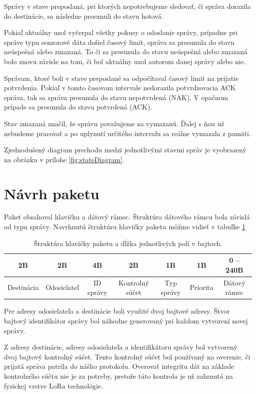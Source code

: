 \documentclass[slovak,master]{diploma}
\begin{document}
Správy v stave preposlaná, pri ktorých nepotrebujeme sledovať, či správa dorazila do destinácie, sa následne presunuli do stavu hotová.

Pokiaľ aktuálny uzol vyčerpal všetky pokusy o odoslanie správy, prípadne pri správe typu senzorové dáta došiel časový limit, správa sa presunula do stavu neúspešná alebo zmazaná.
To či sa presunula do stavu neúspešná alebo zmazaná bolo znovu závisle na tom, či bol aktuálny uzol autorom danej správy alebo nie.

Správam, ktoré boli v stave preposlané sa odpočítaval časový limit na prijatie potvrdenia. Pokiaľ v tomto časovom intervale nedorazila potvrdzovacia ACK správa, tak sa 
správa presunula do stavu nepotvrdená (NAK). V opačnom prípade sa presunula do stavu potvrdená (ACK).

Stav zmazaná značil, že správu považujeme za vymazanú. Ďalej s ňou už nebudeme pracovať a po uplynutí určitého intervalu sa reálne vymazala z pamäti.

Zjednodušený diagram prechodu medzi jednotlivými stavmi správ je vyobrazený na obrázku v prílohe \ref{fig:stateDiagram}.

\section{Návrh paketu}
Paket obsahoval hlavičku a dátový rámec. Štruktúra dátového rámcu bola závislá od typu správy.
Navrhnutú štruktúru hlavičky paketu môžme vidieť v tabuľke \ref{tab:packetHeader}

\begin{table}[!h]
	\centering
  \caption{Štruktúra hlavičky paketu a dĺžka jednotlivých polí v bajtoch.}
  \begin{tabular}{|c|c|c|c|c|c|c|}
    \toprule
    2B & 2B & 4B & 2B & 1B & 1B & 0 -- 240B \\
    \midrule
    Destinácia & Odosielateľ & ID správy & Kontrolný súčet & Typ správy & Priorita & Dátový rámec \\
    \midrule
  \end{tabular}
  \label{tab:packetHeader}
\end{table}

Pre adresy odosielateľa a destinácie boli využité dvoj bajtové adresy. Štvor bajtový identifikátor správy bol náhodne generovaný pri každom vytvorení novej správy.

Z adresy destinácie, adresy odosielateľa a identifikátoru správy bol vytvorený dvoj bajtový kontrolný súčet. Tento kontrolný súčet bol používaný na overenie, či prijatá správa 
patrila do nášho protokolu. Overovať integritu dát na základe kontrolného súčtu nie je za potreby, pretože táto kontrola je už zahrnutá na fyzickej vrstve LoRa technológie.
\end{document}
